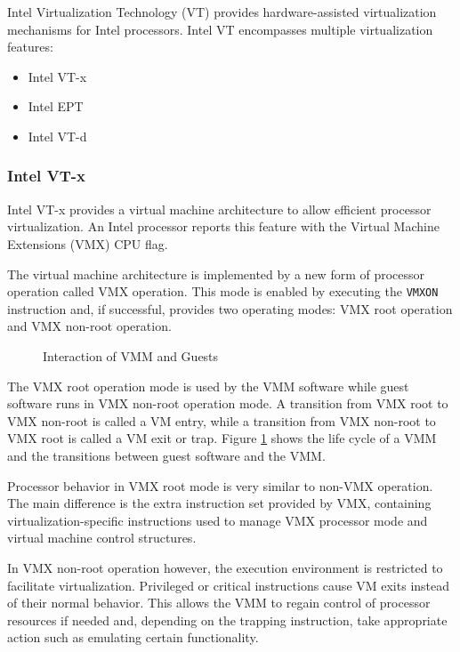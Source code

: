 Intel Virtualization Technology (VT) provides hardware-assisted
virtualization mechanisms for Intel processors. Intel VT encompasses multiple
virtualization features:
\begin{itemize}
	\item Intel VT-x
	\item Intel EPT
	\item Intel VT-d
\end{itemize}

\subsubsection{Intel VT-x}
Intel VT-x provides a virtual machine architecture to allow
efficient processor virtualization. An Intel processor reports this feature
with the Virtual Machine Extensions (VMX) CPU flag.

The virtual machine architecture is implemented by a new form of processor
operation called VMX operation. This mode is enabled by executing the
\texttt{VMXON} instruction and, if successful, provides two operating modes:
VMX root operation and VMX non-root operation.

\begin{figure}[h]
	\centering
	
	\caption{Interaction of VMM and Guests}
	\label{fig:vmm-lifecycle}
\end{figure}

The VMX root operation mode is used by the VMM software while guest software
runs in VMX non-root operation mode. A transition from VMX root to VMX non-root
is called a VM entry, while a transition from VMX non-root to VMX root is called
a VM exit or trap. Figure \ref{fig:vmm-lifecycle} shows the life cycle of a VMM
and the transitions between guest software and the VMM.

Processor behavior in VMX root mode is very similar to non-VMX operation.  The
main difference is the extra instruction set provided by VMX, containing
virtualization-specific instructions used to manage VMX processor mode and
virtual machine control structures.

In VMX non-root operation however, the execution environment is restricted to
facilitate virtualization. Privileged or critical instructions cause VM exits
instead of their normal behavior. This allows the VMM to regain control of
processor resources if needed and, depending on the trapping instruction, take
appropriate action such as emulating certain functionality.

